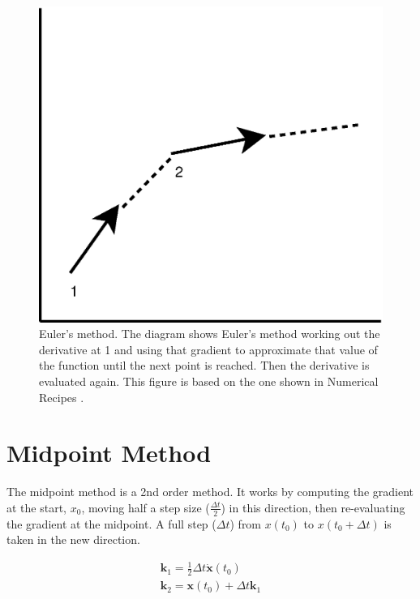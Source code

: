 \begin{figure}
	\begin{center}
    		\includegraphics[height=0.25\textheight]{Euler}
	\end{center}
    \caption{\label{Fig:Euler}Euler's method. The diagram shows Euler's
    method working out the derivative at 1 and using that gradient to
    approximate that value of the function until the next point is reached. Then
    the derivative is evaluated again. This figure is based on the one shown in
    Numerical Recipes \cite{NumRecipes}.}
\end{figure}

\section{Midpoint Method}
The midpoint method is a 2nd order method. It works by computing the gradient at
the start, $x_0$, moving half a step size ($\frac{\Delta t}{2}$) in this
direction, then re-evaluating the gradient at the midpoint. A full step ($\Delta
t$) from $x(t_0)$ to $x(t_0 + \Delta t)$ is taken in the new direction.

\begin{eqnarray}
    \mathbf{k}_1 = \frac{1}{2}\Delta t \dot{\mathbf{x}}(t_0)\\
    \mathbf{k}_2 = \mathbf{x}(t_0) + \Delta t \mathbf{k}_1
\end{eqnarray}

